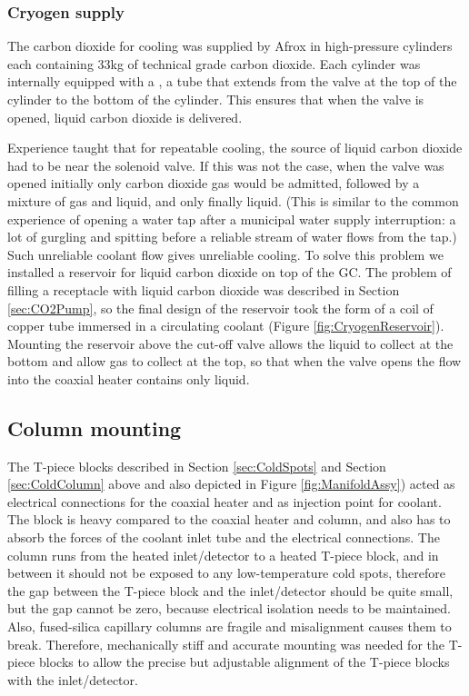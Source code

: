 \subsubsection{Cryogen supply}

The carbon dioxide for cooling was supplied by Afrox in high-pressure
cylinders each containing 33kg of technical grade carbon dioxide. Each cylinder
was internally equipped with a , a tube that extends from the
valve at the top of the cylinder to the bottom of the cylinder. This ensures
that when the valve is opened, liquid carbon dioxide is delivered.

Experience taught that for repeatable cooling, the source of liquid carbon
dioxide had to be near the solenoid valve. If this was not the case, when the
valve was opened initially only carbon dioxide gas would be admitted, followed
by a mixture of gas and liquid, and only finally liquid. (This is similar to the
common experience of opening a water tap after a municipal water supply
interruption: a lot of gurgling and spitting before a reliable stream of water
flows from the tap.) Such unreliable coolant flow gives unreliable cooling.
To solve this problem we installed a reservoir for liquid carbon dioxide on top
of the GC. The problem of filling a receptacle with liquid carbon dioxide was
described in Section \ref{sec:CO2Pump}, so the final design of the reservoir
took the form of a coil of copper tube immersed in a circulating coolant (Figure
\ref{fig:CryogenReservoir}). Mounting the reservoir above the cut-off valve
allows the liquid to collect at the bottom and allow gas to collect at the top,
so that when the valve opens the flow into the coaxial heater contains only
liquid.

\subsection{Column mounting}

The T-piece blocks described in Section \ref{sec:ColdSpots} and Section
\ref{sec:ColdColumn} above and also depicted in Figure \ref{fig:ManifoldAssy}) acted as electrical
connections for the coaxial heater and as injection point for coolant. The block
is heavy compared to the coaxial heater and column, and also has to absorb the
forces of the coolant inlet tube and the electrical connections. The column runs
from the heated inlet/detector to a heated T-piece block, and in between it
should not be exposed to any low-temperature cold spots, therefore the gap
between the T-piece block and the inlet/detector should be quite small, but the
gap cannot be zero, because electrical isolation needs to be maintained.
Also, fused-silica capillary columns are fragile and misalignment causes them to
break. Therefore, mechanically stiff and accurate mounting was needed for the
T-piece blocks to allow the precise but adjustable alignment of the T-piece
blocks with the inlet/detector.

